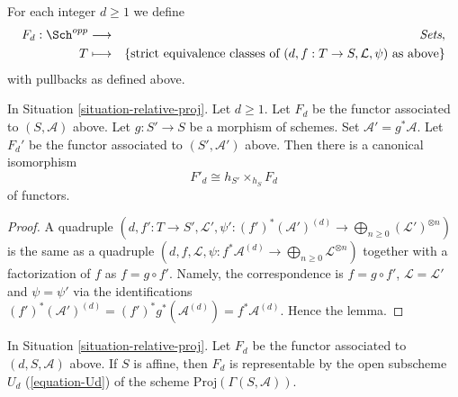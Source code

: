 \medskip\noindent
For each integer $d \geq 1$ we define
\begin{eqnarray*}
F_d : \Sch^{opp} & \longrightarrow & \textit{Sets}, \\
T & \longmapsto &
\{\text{strict equivalence classes of }
(d, f : T \to S, \mathcal{L}, \psi)
\text{ as above}\}
\end{eqnarray*}
with pullbacks as defined above.

\begin{lemma}
\label{lemma-proj-base-change}
In Situation \ref{situation-relative-proj}. Let $d \geq 1$.
Let $F_d$ be the functor
associated to $(S, \mathcal{A})$ above.
Let $g : S' \to S$ be a morphism of schemes.
Set $\mathcal{A}' = g^*\mathcal{A}$. Let $F_d'$ be the
functor associated to $(S', \mathcal{A}')$ above.
Then there is a canonical isomorphism
$$
F'_d \cong h_{S'} \times_{h_S} F_d
$$
of functors.
\end{lemma}

\begin{proof}
A quadruple
$(d, f' : T \to S', \mathcal{L}',
\psi' : (f')^*(\mathcal{A}')^{(d)} \to
\bigoplus_{n \geq 0} (\mathcal{L}')^{\otimes n})$
is the same as a quadruple
$(d, f, \mathcal{L},
\psi : f^*\mathcal{A}^{(d)} \to
\bigoplus_{n \geq 0} \mathcal{L}^{\otimes n})$
together with a factorization of $f$ as $f = g \circ f'$. Namely,
the correspondence is $f = g \circ f'$, $\mathcal{L} = \mathcal{L}'$
and $\psi = \psi'$ via the identifications
$(f')^*(\mathcal{A}')^{(d)} = (f')^*g^*(\mathcal{A}^{(d)}) =
f^*\mathcal{A}^{(d)}$. Hence the lemma.
\end{proof}

\begin{lemma}
\label{lemma-relative-proj-affine}
In Situation \ref{situation-relative-proj}. Let $F_d$ be the functor
associated to $(d, S, \mathcal{A})$ above.
If $S$ is affine, then $F_d$ is representable by the open subscheme
$U_d$ (\ref{equation-Ud})
of the scheme $\text{Proj}(\Gamma(S, \mathcal{A}))$.
\end{lemma}

